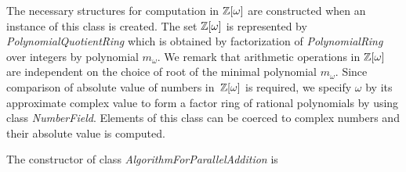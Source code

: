 The necessary structures for computation in $\mathbb{Z}[\omega]$ are constructed when an instance of this class is created. 
The set $\mathbb{Z}[\omega]$ is represented by \emph{PolynomialQuotientRing} which is obtained by factorization of \emph{PolynomialRing} over integers by polynomial $m_\omega$. 
We remark that arithmetic operations in $\mathbb{Z}[\omega]$ are independent on the choice of root of the  minimal polynomial $m_\omega$. Since comparison of absolute value of numbers in~$\mathbb{Z}[\omega]$ is required, we specify $\omega$ by its approximate complex value to form a factor ring of rational polynomials by using class \emph{NumberField}. Elements of this class can be coerced to complex numbers and their absolute value is computed.

%

The constructor of class \emph{AlgorithmForParallelAddition} is 

